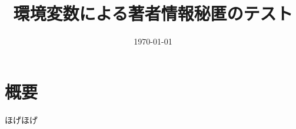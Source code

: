 \documentclass{bxjsarticle}
\title{環境変数による著者情報秘匿のテスト}
\author{\directlua{tex.print(os.getenv("AUTHOR_NAME"))}}
\date{\today}
\begin{document}
\maketitle

\section{概要}
ほげほげ
\end{document}
